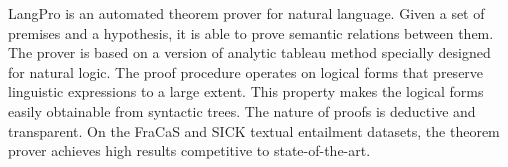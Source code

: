 LangPro is an automated theorem prover for natural language. Given a set of premises and a hypothesis, it is able to prove semantic relations between them. The prover is based on a version of analytic tableau method specially designed for natural logic. The proof procedure operates on logical forms that preserve linguistic expressions to a large extent. This property makes the logical forms easily obtainable from syntactic trees. The nature of proofs is deductive and transparent. On the FraCaS and SICK textual entailment datasets, the theorem prover achieves high results competitive to state-of-the-art.
